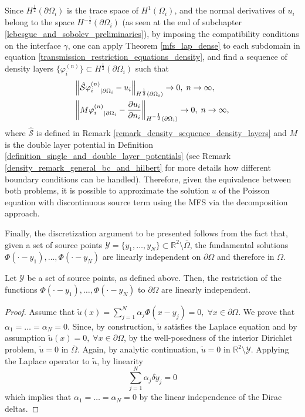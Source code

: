 Since \(H^\frac{1}{2}(\partial \Omega_i)\) is the trace space of \(H^1(\Omega_i)\), and the normal derivatives of \(u_i\) belong to the space \(H^{-\frac{1}{2}}(\partial\Omega_i)\) (as seen at the end of subchapter \ref{lebesgue_and_sobolev_preliminaries}), by imposing the compatibility conditions on the interface \(\gamma\), one can apply Theorem \ref{mfs_lap_dense} to each subdomain in equation \eqref{transmission_restriction_equations_density}, and find a sequence of density layers \(\{\varphi^{(n)}_i\} \subset H^{\frac{1}{2}}(\partial\Omega_i)\) such that
\begin{align*}
    &\norm{{\hat{\mathcal{S}}\varphi^{(n)}_i}_{|\partial\Omega_i} - u_i}_{H^\frac{1}{2}(\partial\Omega_i)} \rightarrow 0, \; n \rightarrow \infty,\\
    &\norm{{M\varphi^{(n)}_i}_{|\partial\Omega_i} - \frac{\partial u_i}{\partial n_i}}_{H^{-\frac{1}{2}}(\partial\Omega_i)} \rightarrow 0, \; n \rightarrow \infty,
\end{align*}
where \(\hat{\mathcal{S}}\) is defined in Remark \ref{remark_density_sequence_density_layers} and \(M\) is the double layer potential in Definition \ref{definition_single_and_double_layer_potentials} (see Remark \ref{density_remark_general_bc_and_hilbert} for more details how different boundary conditions can be handled). Therefore, given the equivalence between both problems, it is possible to approximate the solution \(u\) of the Poisson equation with discontinuous source term using the MFS via the decomposition approach.

Finally, the discretization argument to be presented follows from the fact that, given a set of source points \(\mathcal{Y} = \{y_1,\dots, y_N\} \subset \mathbb{R}^2\setminus\overline{\Omega}\), the fundamental solutions \(\Phi(\cdot-y_1),\dots,\Phi(\cdot-y_N)\) are linearly independent on \(\partial \Omega\) and therefore in \(\Omega\).
\begin{theorem}\label{lapl_li}
    Let \(\mathcal{Y}\) be a set of source points, as defined above. Then, the restriction of the functions \(\Phi(\cdot-y_1),\dots,\Phi(\cdot-y_N)\) to \(\partial\Omega\) are linearly independent.
\end{theorem}
\begin{proof}
    Assume that \(\tilde{u}(x) = \sum_{j=1}^{N}\alpha_j \Phi(x-y_j) = 0, \; \forall x \in \partial\Omega\). We prove that \(\alpha_1=\dots=\alpha_N = 0\). Since, by construction, \(\tilde{u}\) satisfies the Laplace equation and by assumption \(\tilde{u}(x) = 0, \; \forall x \in \partial\Omega\), by the well-posedness of the interior Dirichlet problem, \(\tilde{u} = 0\) in \(\overline{\Omega}\). Again, by analytic continuation, \(\tilde{u} = 0\) in \(\mathbb{R}^2\setminus\mathcal{Y}\). Applying the Laplace operator to \(\tilde{u}\), by linearity
    \[
        \sum_{j=1}^{N}\alpha_j \delta{y_j} = 0
    \]
    which implies that \(\alpha_1=\dots=\alpha_N = 0\) by the linear independence of the Dirac deltas.
\end{proof}

